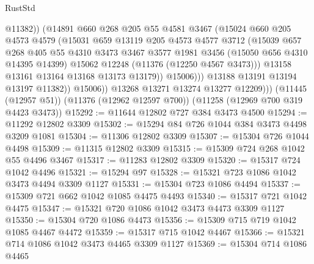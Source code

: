 \begin{lexlean}{RustStd}
\begin{coremodule}
{\begin{coremodule}
{{{{{{{{{{{{{{{{{{{{{{{{{{{{{{{{{{{{{{{{{{{{{{{{{{{{{{{{{{{{{{{{{{{{{{{{{{{{{{{{{{{{{                          @11382))
                      (@14891
                        @660
                        @268
                        @205
                        @55
                        @4581
                        @3467
                        (@15024
                          @660
                          @205
                          @4573
                          @4579
                          (@15031
                            @659
                            @13119
                            @205
                            @4573
                            @4577
                            @3712
                            (@15039
                              @657
                              @268
                              @405
                              @55
                              @4310
                              @3473
                              @3467
                              @3577
                              @1981
                              @3456
                              (@15050 @656 @4310 @14395 @14399)
                              @15062
                              @12248
                              (@11376 (@12250 @4567 @3473)))
                            @13158
                            @13161
                            @13164
                            @13168
                            @13173
                            @13179))
                        @15006)))
                  @13188
                  @13191
                  @13194
                  @13197
                  @11382))
              @15006))
          @13268
          @13271
          @13274
          @13277
          @12209)))
    (@11445 (@12957 @51))
    (@11376 (@12962 @12597 @700))
    (@11258 (@12969 @700 @319 @4423 @3473))
@15292 := @11644 @12802 @727 @384 @3473 @4500
@15294 := @11292 @12802 @3309
@15302 := @15294 @84 @726 @1044 @384 @3473 @4498 @3209 @1081
@15304 := @11306 @12802 @3309
@15307 := @15304 @726 @1044 @4498
@15309 := @11315 @12802 @3309
@15315 := @15309 @724 @268 @1042 @55 @4496 @3467
@15317 := @11283 @12802 @3309
@15320 := @15317 @724 @1042 @4496
@15321 := @15294 @97
@15328 := @15321 @723 @1086 @1042 @3473 @4494 @3309 @1127
@15331 := @15304 @723 @1086 @4494
@15337 := @15309 @721 @662 @1042 @1085 @4475 @4493
@15340 := @15317 @721 @1042 @4475
@15347 := @15321 @720 @1086 @1042 @3473 @4473 @3309 @1127
@15350 := @15304 @720 @1086 @4473
@15356 := @15309 @715 @719 @1042 @1085 @4467 @4472
@15359 := @15317 @715 @1042 @4467
@15366 := @15321 @714 @1086 @1042 @3473 @4465 @3309 @1127
@15369 := @15304 @714 @1086 @4465
}}}}}}}}}}}}}}}}}}}}}}}}}}}}}}}}}}}}}}}}}}}}}}}}}}}}}}}}}}}}}}}}}}}}}}}}}}}}}}}}}}}}}
\end{coremodule}}
\end{coremodule}
\end{lexlean}

